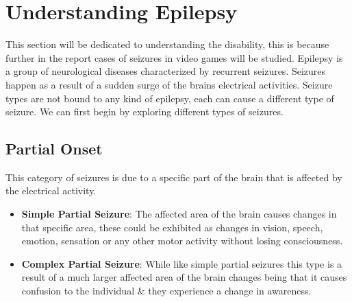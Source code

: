 \documentclass[twocolumn, 10pt, conference]{ieeetran}
\begin{document}
\section{Understanding Epilepsy}
This section will be dedicated to understanding the disability, this is because further in the report cases of seizures in video games will be studied. Epilepsy is a group of neurological diseases characterized by recurrent seizures. Seizures happen as a result of a sudden surge of the brains electrical activities. Seizure types are not bound to any kind of epilepsy, each can cause a different type of seizure. We can first begin by exploring different types of seizures.

\subsection{Partial Onset}
This category of seizures is due to a specific part of the brain that is affected by the electrical activity.
\begin{itemize}
	\item \textbf{Simple Partial Seizure}: The affected area of the brain causes changes in that specific area, these could be exhibited as changes in vision, speech, emotion, sensation or any other motor activity without losing consciousness.
	\item \textbf{Complex Partial Seizure}: While like simple partial seizures this type is a result of a much larger affected area of the brain changes being that it causes confusion to the individual \& they experience a change in awareness.
\end{itemize}
\end{document}
